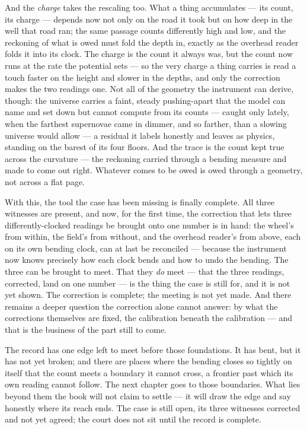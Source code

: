 And the \emph{charge} takes the rescaling too. What a thing accumulates --- its count, its charge --- depends
now not only on the road it took but on how deep in the well that road ran; the same passage counts differently
high and low, and the reckoning of what is owed must fold the depth in, exactly as the overhead reader folds it
into its clock. The charge is the count it always was, but the count now runs at the rate the potential sets ---
so the very charge a thing carries is read a touch faster on the height and slower in the depths, and only the
correction makes the two readings one. Not all of the geometry the instrument can derive, though: the universe
carries a faint, steady pushing-apart that the model can name and set down but cannot compute from its counts
--- caught only lately, when the farthest supernovae came in dimmer, and so farther, than a slowing universe
would allow --- a residual it labels honestly and leaves as physics, standing on the barest of its four floors. And the trace is the count kept true across the curvature --- the reckoning carried
through a bending measure and made to come out right. Whatever comes to be owed is owed through a geometry, not
across a flat page.

With this, the tool the case has been missing is finally complete. All three witnesses are present, and now, for
the first time, the correction that lets three differently-clocked readings be brought onto one number is in
hand: the wheel's from within, the field's from without, and the overhead reader's from above, each on its own
bending clock, can at last be reconciled --- because the instrument now knows precisely how each clock bends and
how to undo the bending. The three can be brought to meet. That they \emph{do} meet --- that the three readings,
corrected, land on one number --- is the thing the case is still for, and it is not yet shown. The correction is
complete; the meeting is not yet made. And there remains a deeper question the correction alone cannot answer:
by what the corrections themselves are fixed, the calibration beneath the calibration --- and that is the
business of the part still to come.

The record has one edge left to meet before those foundations. It has bent, but it has not yet broken; and there
are places where the bending closes so tightly on itself that the count meets a boundary it cannot cross, a
frontier past which its own reading cannot follow. The next chapter goes to those boundaries. What lies beyond
them the book will not claim to settle --- it will draw the edge and say honestly where its reach ends. The case
is still open, its three witnesses corrected and not yet agreed; the court does not sit until the record is
complete.

